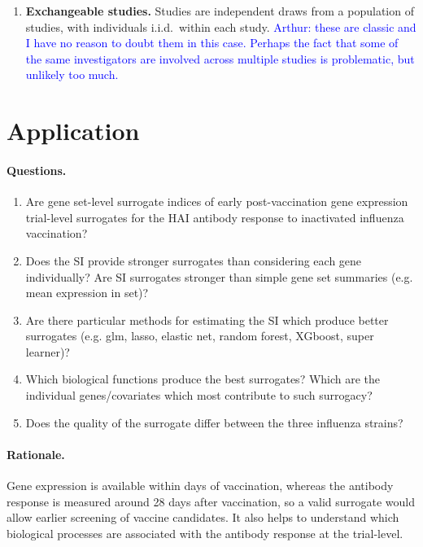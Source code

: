 \documentclass{article}
\begin{document}
\begin{enumerate}
    \textcolor{blue}{Arthur: these are the untestable assumptions to avoid the surrogate paradox we state in RISE. They are needed to interpret surrogacy, not to identify $U_{Y,k}$ and $U_{g,k}$ causally.}
    \item \textbf{Exchangeable studies.} Studies are independent draws from a population of studies, with individuals i.i.d.\ within each study.
    \textcolor{blue}{Arthur: these are classic and I have no reason to doubt them in this case. Perhaps the fact that some of the same investigators are involved across multiple studies is problematic, but unlikely too much.}
\end{enumerate}

\section*{Application}

\paragraph{Questions.}
\begin{enumerate}
    \item Are gene set-level surrogate indices of early post-vaccination gene expression trial-level surrogates for the HAI antibody response to inactivated influenza vaccination?
    \item Does the SI provide stronger surrogates than considering each gene individually? Are SI surrogates stronger than simple gene set summaries (e.g. mean expression in set)?
    \item Are there particular methods for estimating the SI which produce better surrogates (e.g. glm, lasso, elastic net, random forest, XGboost, super learner)?
    \item Which biological functions produce the best surrogates? Which are the individual genes/covariates which most contribute to such surrogacy?
    \item Does the quality of the surrogate differ between the three influenza strains?
\end{enumerate}

\paragraph{Rationale.} Gene expression is available within days of vaccination, whereas the antibody response is measured around 28 days after vaccination, so a valid surrogate would allow earlier screening of vaccine candidates. It also helps to understand which biological processes are associated with the antibody response at the trial-level.
\end{document}
